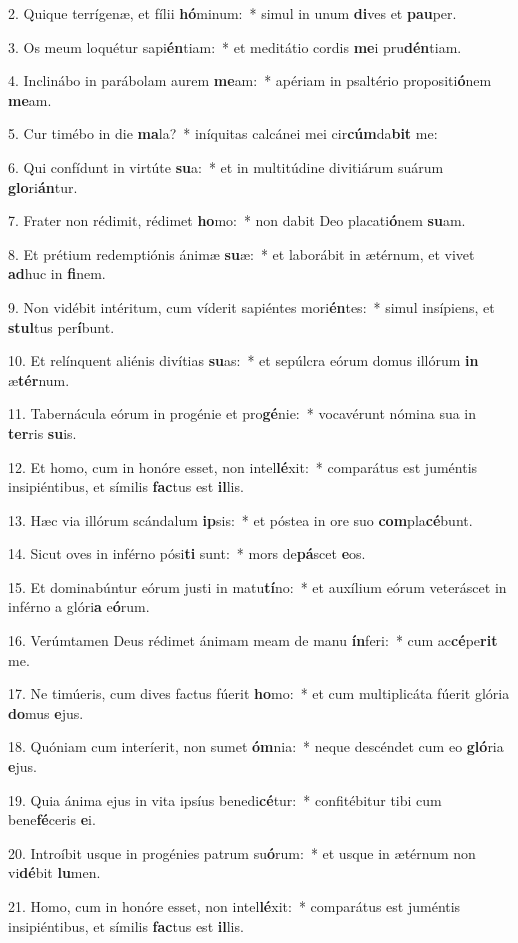2. Quique terrígenæ, et fílii \textbf{hó}minum:~*  simul in unum \textbf{di}ves et \textbf{pau}per.\

3. Os meum loquétur sapi\textbf{én}tiam:~*  et meditátio cordis \textbf{me}i pru\textbf{dén}tiam.\

4. Inclinábo in parábolam aurem \textbf{me}am:~*  apériam in psaltério propositi\textbf{ó}nem \textbf{me}am.\

5. Cur timébo in die \textbf{ma}la?~*  iníquitas calcánei mei cir\textbf{cúm}da\textbf{bit} me:\

6. Qui confídunt in virtúte \textbf{su}a:~*  et in multitúdine divitiárum suárum \textbf{glo}ri\textbf{án}tur.\

7. Frater non rédimit, rédimet \textbf{ho}mo:~*  non dabit Deo placati\textbf{ó}nem \textbf{su}am.\

8. Et prétium redemptiónis ánimæ \textbf{su}æ:~*  et laborábit in ætérnum, et vivet \textbf{ad}huc in \textbf{fi}nem.\

9. Non vidébit intéritum, cum víderit sapiéntes mori\textbf{én}tes:~*  simul insípiens, et \textbf{stul}tus per\textbf{í}bunt.\

10. Et relínquent aliénis divítias \textbf{su}as:~*  et sepúlcra eórum domus illórum \textbf{in} æ\textbf{tér}num.\

11. Tabernácula eórum in progénie et pro\textbf{gé}nie:~*  vocavérunt nómina sua in \textbf{ter}ris \textbf{su}is.\

12. Et homo, cum in honóre esset, non intel\textbf{lé}xit:~*  comparátus est juméntis insipiéntibus, et símilis \textbf{fac}tus est \textbf{il}lis.\

13. Hæc via illórum scándalum \textbf{ip}sis:~*  et póstea in ore suo \textbf{com}pla\textbf{cé}bunt.\

14. Sicut oves in inférno pósi\textbf{ti} sunt:~*  mors de\textbf{pá}scet \textbf{e}os.\

15. Et dominabúntur eórum justi in matu\textbf{tí}no:~*  et auxílium eórum veteráscet in inférno a glóri\textbf{a} e\textbf{ó}rum.\

16. Verúmtamen Deus rédimet ánimam meam de manu \textbf{ín}feri:~*  cum ac\textbf{cé}pe\textbf{rit} me.\

17. Ne timúeris, cum dives factus fúerit \textbf{ho}mo:~*  et cum multiplicáta fúerit glória \textbf{do}mus \textbf{e}jus.\

18. Quóniam cum interíerit, non sumet \textbf{óm}nia:~*  neque descéndet cum eo \textbf{gló}ria \textbf{e}jus.\

19. Quia ánima ejus in vita ipsíus benedi\textbf{cé}tur:~*  confitébitur tibi cum bene\textbf{fé}ceris \textbf{e}i.\

20. Introíbit usque in progénies patrum su\textbf{ó}rum:~*  et usque in ætérnum non vi\textbf{dé}bit \textbf{lu}men.\

21. Homo, cum in honóre esset, non intel\textbf{lé}xit:~*  comparátus est juméntis insipiéntibus, et símilis \textbf{fac}tus est \textbf{il}lis.\

